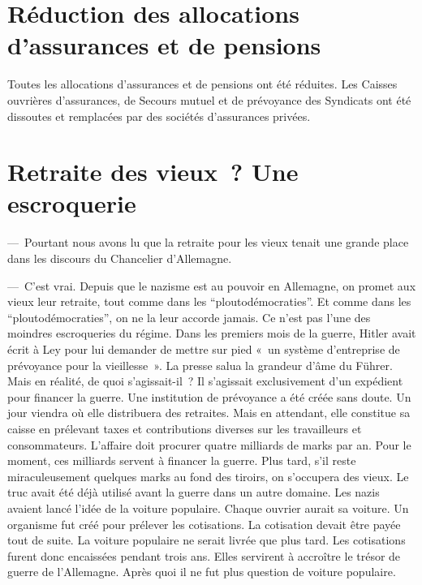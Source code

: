 \documentclass[french,twoside]{book} %
\begin{document}
\section[Réduction des allocations d’assurances et de pensions]{Réduction des allocations d’assurances et de pensions}
\noindent Toutes les allocations d’assurances et de pensions ont été réduites. Les Caisses ouvrières d’assurances, de Secours mutuel et de prévoyance des Syndicats ont été dissoutes et remplacées par des sociétés d’assurances privées.
\section[Retraite des vieux ? Une escroquerie]{Retraite des vieux ? Une escroquerie}
\noindent — Pourtant nous avons lu que la retraite pour les vieux tenait une grande place dans les discours du Chancelier d’Allemagne.\par
— C’est vrai. Depuis que le nazisme est au pouvoir en Allemagne, on promet aux vieux leur retraite, tout comme dans les “ploutodémocraties”. Et comme dans les “ploutodémocraties”, on ne la leur accorde jamais. Ce n’est pas l’une des moindres escroqueries du régime. Dans les premiers mois de la guerre, Hitler avait écrit à Ley pour lui demander de mettre sur pied « un système d’entreprise de prévoyance pour la vieillesse ». La presse salua la grandeur d’âme du Führer. Mais en réalité, de quoi s’agissait-il ? Il s’agissait exclusivement d’un expédient pour financer la guerre. Une institution de prévoyance a été créée sans doute. Un jour viendra où elle distribuera des retraites. Mais en attendant, elle constitue sa caisse en prélevant taxes et contributions diverses sur les travailleurs et consommateurs. L’affaire doit procurer quatre milliards de marks par an. Pour le moment, ces milliards servent à financer la guerre. Plus tard, s’il reste miraculeusement quelques marks au fond des tiroirs, on s’occupera des vieux. Le truc avait été déjà utilisé avant la guerre dans un autre domaine. Les nazis avaient lancé l’idée de la voiture populaire. Chaque ouvrier aurait sa voiture. Un organisme fut créé pour prélever les cotisations. La cotisation devait être payée tout de suite. La voiture populaire ne serait livrée que plus tard. Les cotisations furent donc encaissées pendant trois ans. Elles servirent à accroître le trésor de guerre de l’Allemagne. Après quoi il ne fut plus question de voiture populaire.
\end{document}
